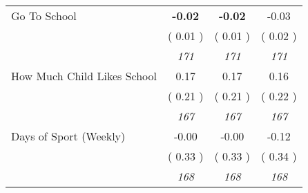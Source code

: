 \begin{tabular}{l c c c}
Go To School & \textbf{     -0.02 } & \textbf{     -0.02 } &     -0.03 \\
& (     0.01 ) & (     0.01 ) & (     0.02 ) \\
& \textit{ 171 } & \textit{ 171 } & \textit{ 171 } \\
How Much Child Likes School &      0.17 &      0.17 &      0.16 \\
& (     0.21 ) & (     0.21 ) & (     0.22 ) \\
& \textit{ 167 } & \textit{ 167 } & \textit{ 167 } \\
Days of Sport (Weekly) &     -0.00 &     -0.00 &     -0.12 \\
& (     0.33 ) & (     0.33 ) & (     0.34 ) \\
& \textit{ 168 } & \textit{ 168 } & \textit{ 168 } \\
\bottomrule
\end{tabular}
